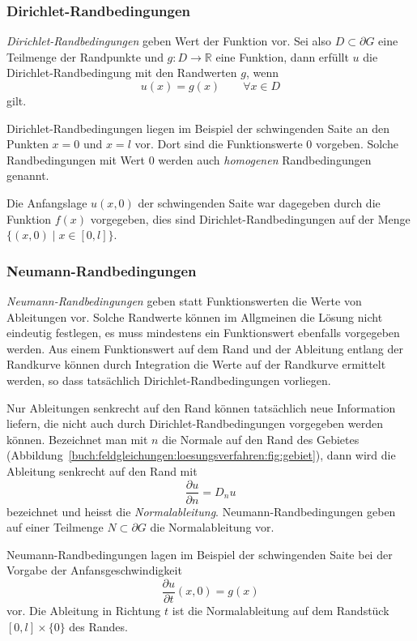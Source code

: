 %
%
\subsubsection{Dirichlet-Randbedingungen}
%
{\em Dirichlet-Randbedingungen} geben Wert der Funktion vor.
Sei also $D\subset\partial G$ eine Teilmenge der Randpunkte
und $g\colon D\to\mathbb{R}$ eine Funktion, dann erfüllt $u$
die Dirichlet-Randbedingung mit den Randwerten $g$, wenn
\[
u(x) = g(x)\qquad \forall x\in D
\]
gilt.

Dirichlet-Randbedingungen liegen im Beispiel der schwingenden Saite
an den Punkten $x=0$ und $x=l$ vor.
Dort sind die Funktionswerte $0$ vorgeben.
Solche Randbedingungen mit Wert 0 werden auch {\em homogenen} 
Randbedingungen genannt.

Die Anfangslage $u(x,0)$ der schwingenden Saite war dagegeben durch
die Funktion $f(x)$ vorgegeben, dies sind Dirichlet-Randbedingungen
auf der Menge $\{(x,0)\mid x\in[0,l]\}$.

\subsubsection{Neumann-Randbedingungen}
%
{\em Neumann-Randbedingungen} geben statt Funktionswerten die Werte
von Ableitungen vor.
Solche Randwerte können im Allgmeinen die Lösung nicht eindeutig
festlegen, es muss mindestens ein Funktionswert ebenfalls vorgegeben
werden.
Aus einem Funktionswert auf dem Rand und der Ableitung entlang
der Randkurve können durch Integration die Werte auf der Randkurve
ermittelt werden, so dass tatsächlich Dirichlet-Randbedingungen
vorliegen.

Nur Ableitungen senkrecht auf den Rand können tatsächlich neue
Information liefern, die nicht auch durch Dirichlet-Randbedingungen
vorgegeben werden können.
Bezeichnet man mit $n$ die Normale auf den Rand des Gebietes
(Abbildung~\ref{buch:feldgleichungen:loesungsverfahren:fig:gebiet}),
dann wird die Ableitung senkrecht auf den Rand mit
\[
\frac{\partial u}{\partial n}
=
D_n u
\]
bezeichnet und heisst die {\em Normalableitung}.
%
Neumann-Randbedingungen geben auf einer Teilmenge $N\subset\partial G$
die Normalableitung vor.

Neumann-Randbedingungen lagen im Beispiel der schwingenden Saite bei
der Vorgabe der Anfansgeschwindigkeit
\[
\frac{\partial u}{\partial t}(x,0)
=
g(x)
\]
vor.
Die Ableitung in Richtung $t$ ist die Normalableitung auf dem Randstück
$[0,l]\times \{0\}$ des Randes.

